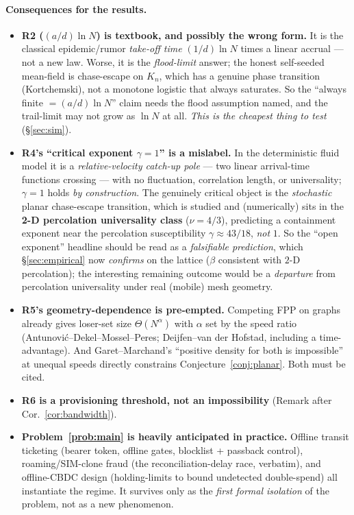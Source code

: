 \documentclass[11pt]{article}
\theoremstyle{plain}
\theoremstyle{definition}
\begin{document}
\paragraph{Consequences for the results.}
\begin{itemize}[leftmargin=1.4em,itemsep=2pt]
  \item \textbf{R2 ($(a/d)\ln N$) is textbook, and possibly the wrong form.} It is
  the classical epidemic/rumor \emph{take-off time} $(1/d)\ln N$ times a linear
  accrual --- not a new law. Worse, it is the \emph{flood-limit} answer; the honest
  self-seeded mean-field is chase-escape on $K_n$, which has a genuine phase
  transition (Kortchemski), not a monotone logistic that always saturates. So the
  ``always finite $= (a/d)\ln N$'' claim needs the flood assumption named, and the
  trail-limit may not grow as $\ln N$ at all. \emph{This is the cheapest thing to
  test} (\S\ref{sec:sim}).
  \item \textbf{R4's ``critical exponent $\gamma=1$'' is a mislabel.} In the
  deterministic fluid model it is a \emph{relative-velocity catch-up pole} --- two
  linear arrival-time functions crossing --- with no fluctuation, correlation
  length, or universality; $\gamma=1$ holds \emph{by construction}. The genuinely
  critical object is the \emph{stochastic} planar chase-escape transition, which is
  studied and (numerically) sits in the \textbf{2-D percolation universality class}
  ($\nu=4/3$), predicting a containment exponent near the percolation susceptibility
  $\gamma\approx 43/18$, \emph{not} $1$. So the ``open exponent'' headline should be
  read as a \emph{falsifiable prediction}, which \S\ref{sec:empirical} now
  \emph{confirms} on the lattice ($\beta$ consistent with $2$-D percolation); the
  interesting remaining outcome would be a \emph{departure} from percolation
  universality under real (mobile) mesh geometry.
  \item \textbf{R5's geometry-dependence is pre-empted.} Competing FPP on graphs
  already gives loser-set size $\Theta(N^{\alpha})$ with $\alpha$ set by the speed
  ratio (Antunović--Dekel--Mossel--Peres; Deijfen--van der Hofstad, including a
  time-advantage). And Garet--Marchand's ``positive density for both is
  impossible'' at unequal speeds directly constrains Conjecture~\ref{conj:planar}.
  Both must be cited.
  \item \textbf{R6 is a provisioning threshold, not an impossibility}
  (Remark after Cor.~\ref{cor:bandwidth}).
  \item \textbf{Problem~\ref{prob:main} is heavily anticipated in practice.} Offline
  transit ticketing (bearer token, offline gates, blocklist + passback control),
  roaming/SIM-clone fraud (the reconciliation-delay race, verbatim), and offline-CBDC
  design (holding-limits to bound undetected double-spend) all instantiate the
  regime. It survives only as the \emph{first formal isolation} of the problem, not
  as a new phenomenon.
\end{itemize}
\end{document}
